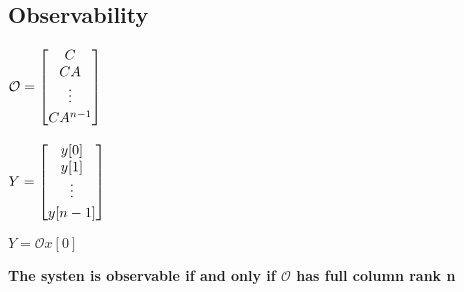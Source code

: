 \subsection{Observability}
    \begin{minipage}{0.33\linewidth}
        \centering
        $\mathcal{O} = \begin{bmatrix} \strut C \\ \strut CA \\ \raisebox{0.5ex}{\vdots} \\  \strut CA^{n-1} \end{bmatrix}$
    \end{minipage}
    \begin{minipage}{0.32\linewidth}
        \centering
        $Y = \begin{bmatrix} \strut y[0] \\ \strut y[1] \\ \raisebox{0.5ex}{\vdots} \\ \strut y[n-1] \end{bmatrix}$
    \end{minipage}
    \begin{minipage}{0.32\linewidth}
        \centering
        $Y = \mathcal{O}x[0]$
    \end{minipage}
    \vspace{3pt}

    \textbf{The systen is observable if and only if $\mathcal{O}$ has full column rank n}